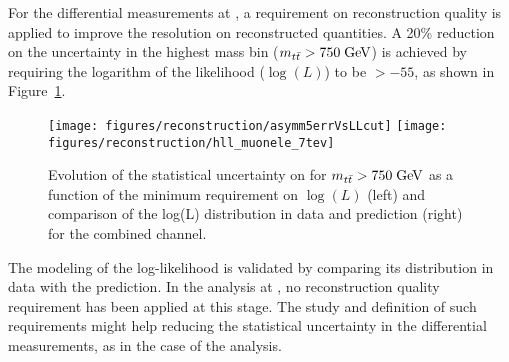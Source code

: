 For the differential measurements at \seventev{}, a
requirement on reconstruction quality is applied to improve the
resolution on reconstructed quantities.
A 20\% reduction on the \ac{} uncertainty in the highest mass bin
($m_{t\bar{t}}{}>750\; \mathrm{GeV}{}$) is achieved by requiring the logarithm of the
likelihood ($\log (L)$) to be $>-55$, as shown in Figure~\ref{fig:errvsllcut}.
\begin{figure}[!htb]\centering
  \texttt{[image: figures/reconstruction/asymm5errVsLLcut]}
  \texttt{[image: figures/reconstruction/hll\_muonele\_7tev]}
  \caption{
    \label{fig:errvsllcut}
    Evolution of the statistical uncertainty on \ac{} for
    $m_{t\bar{t}}{}>750\; \mathrm{GeV}{}$ as a function of the minimum requirement on
    $\log (L)$ (left) and comparison of the log(L) distribution in data
    and prediction (right) for the combined \ljets{} channel.
  }
\end{figure}
The modeling of the log-likelihood is validated by comparing its
distribution in data with the prediction.
In the analysis at \eighttev{}, no reconstruction quality requirement
has been applied at this stage. The study and definition of such
requirements might help reducing the statistical uncertainty in the
differential measurements, as in the case of the \seventev{} analysis.
